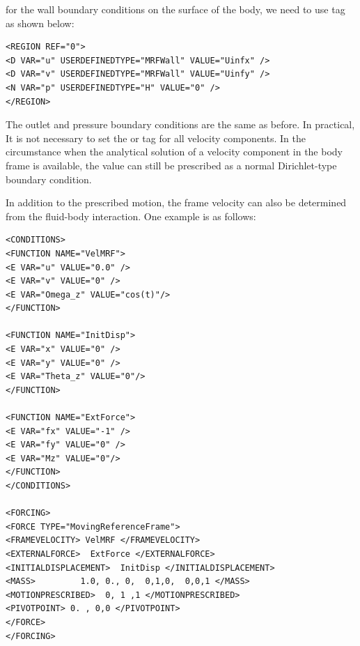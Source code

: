 for the wall boundary conditions on the surface of the body, we need to use  tag as shown below:

\begin{lstlisting}[style=XMLStyle]
<REGION REF="0"> 
<D VAR="u" USERDEFINEDTYPE="MRFWall" VALUE="Uinfx" />
<D VAR="v" USERDEFINEDTYPE="MRFWall" VALUE="Uinfy" />
<N VAR="p" USERDEFINEDTYPE="H" VALUE="0" />  
</REGION>
\end{lstlisting}

The outlet and pressure boundary conditions are the same as before. In practical, It is not necessary to set the  or  tag for all velocity components. In the circumstance when the analytical solution of a velocity component in the body frame is available, the value can still be prescribed as a normal Dirichlet-type boundary condition.

In addition to the prescribed motion, the frame velocity can also be determined from the fluid-body interaction. One example is as follows:
\begin{lstlisting}[style=XMLStyle]
<CONDITIONS>
<FUNCTION NAME="VelMRF">
<E VAR="u" VALUE="0.0" />
<E VAR="v" VALUE="0" />
<E VAR="Omega_z" VALUE="cos(t)"/>
</FUNCTION>

<FUNCTION NAME="InitDisp">
<E VAR="x" VALUE="0" />
<E VAR="y" VALUE="0" />
<E VAR="Theta_z" VALUE="0"/>
</FUNCTION>

<FUNCTION NAME="ExtForce">
<E VAR="fx" VALUE="-1" />
<E VAR="fy" VALUE="0" />
<E VAR="Mz" VALUE="0"/>
</FUNCTION>
</CONDITIONS>

<FORCING>
<FORCE TYPE="MovingReferenceFrame">
<FRAMEVELOCITY> VelMRF </FRAMEVELOCITY>
<EXTERNALFORCE>  ExtForce </EXTERNALFORCE>
<INITIALDISPLACEMENT>  InitDisp </INITIALDISPLACEMENT>
<MASS>         1.0, 0., 0,  0,1,0,  0,0,1 </MASS>
<MOTIONPRESCRIBED>  0, 1 ,1 </MOTIONPRESCRIBED>
<PIVOTPOINT> 0. , 0,0 </PIVOTPOINT>
</FORCE>
</FORCING>
\end{lstlisting}

